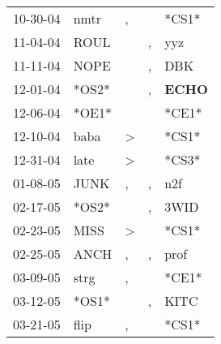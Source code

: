 \begin{supertabular}{p{0.07\textwidth}p{0.06\textwidth}p{0.02\textwidth}p{0.02\textwidth}p{0.06\textwidth}}
          10-30-04\textsuperscript{} &           nmtr\textsuperscript{} &                , &                  &                            *CS1* \\
          11-04-04\textsuperscript{} &           ROUL\textsuperscript{} &                  &                , &            yyz\textsuperscript{} \\
          11-11-04\textsuperscript{} &           NOPE\textsuperscript{} &                  &                , &            DBK\textsuperscript{} \\
          12-01-04\textsuperscript{} &                            *OS2* &                  &                , &  \textbf{ECHO\textsuperscript{}} \\
          12-06-04\textsuperscript{} &                            *OE1* &                  &                  &                            *CE1* \\
          12-10-04\textsuperscript{} &           baba\textsuperscript{} &     \textgreater &                  &                            *CS1* \\
          12-31-04\textsuperscript{} &           late\textsuperscript{} &     \textgreater &                  &                            *CS3* \\
          01-08-05\textsuperscript{} &           JUNK\textsuperscript{} &                , &                , &            n2f\textsuperscript{} \\
          02-17-05\textsuperscript{} &                            *OS2* &                  &                , &           3WID\textsuperscript{} \\
          02-23-05\textsuperscript{} &           MISS\textsuperscript{} &     \textgreater &                  &                            *CS1* \\
          02-25-05\textsuperscript{} &           ANCH\textsuperscript{} &                , &                , &           prof\textsuperscript{} \\
          03-09-05\textsuperscript{} &           strg\textsuperscript{} &                , &                  &                            *CE1* \\
          03-12-05\textsuperscript{} &                            *OS1* &                  &                , &           KITC\textsuperscript{} \\
          03-21-05\textsuperscript{} &           flip\textsuperscript{} &                , &                  &                            *CS1* \\

\end{supertabular}
